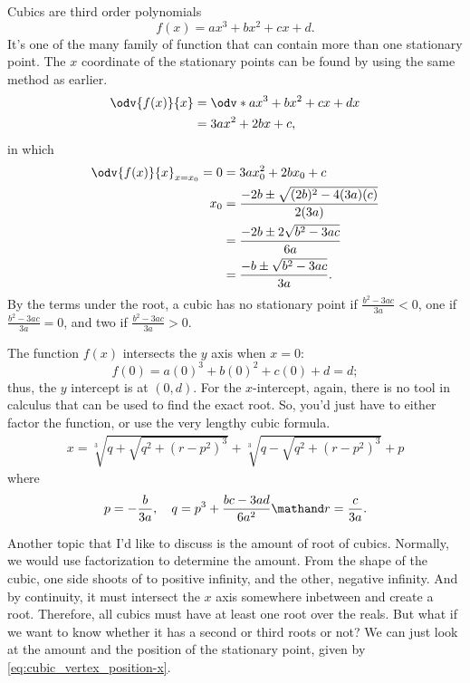 Cubics are third order polynomials
\begin{equation}
	f(x) = ax^3 + bx^2 + cx + d.
\end{equation}
It's one of the many family of function that can contain more than one stationary point. The $x$ coordinate of the stationary points can be found by using the same method as earlier.
\begin{align}
	\odv{f(x)}{x} & = \odv*{ax^3 + bx^2 + cx + d}{x} \\
	              & = 3ax^2 + 2bx + c,
\end{align}
in which
\begin{align}
	\odv{f(x)}{x}_{x = x_0} = 0 & = 3ax_0^2 + 2bx_0 + c                                                     \\
	x_0                         & = \frac{- 2b \pm \sqrt{(2b)^2 - 4(3a)(c)}}{2(3a)}                         \\
	                            & = \frac{- 2b \pm 2\sqrt{b^2 - 3ac}}{6a}                                   \\
	                            & = \frac{- b \pm \sqrt{b^2 - 3ac}}{3a}. \label{eq:cubic_vertex_position-x}
\end{align}
By the terms under the root, a cubic has no stationary point if $\frac{b^2 - 3ac}{3a} < 0$, one if $\frac{b^2 - 3ac}{3a} = 0$, and two if $\frac{b^2 - 3ac}{3a} > 0$.

The function $f(x)$ intersects the $y$ axis when $x = 0$:
\begin{equation}
	f(0) = a(0)^3 + b(0)^2 + c(0) + d = d;
\end{equation}
thus, the $y$ intercept is at $(0, d)$. For the $x$-intercept, again, there is no tool in calculus that can be used to find the exact root. So, you'd just have to either factor the function, or use the very lengthy cubic formula.
\begin{equation}
	\begin{gathered}
		x = \sqrt[3]{q + \sqrt{q^2 + (r - p^2)^3}} + \sqrt[3]{q - \sqrt{q^2 + (r - p^2)^3}} + p
	\end{gathered}
\end{equation}
where
\begin{equation}
	p = -\frac{b}{3a}, \quad q = p^3 + \frac{bc - 3ad}{6a^2} \mathand r = \frac{c}{3a}.
\end{equation}


Another topic that I'd like to discuss is the amount of root of cubics. Normally, we would use factorization to determine the amount. From the shape of the cubic, one side shoots of to positive infinity, and the other, negative infinity. And by continuity, it must intersect the $x$ axis somewhere inbetween and create a root. Therefore, all cubics must have at least one root over the reals. But what if we want to know whether it has a second or third roots or not? We can just look at the amount and the position of the stationary point, given by \cref{eq:cubic_vertex_position-x}.

